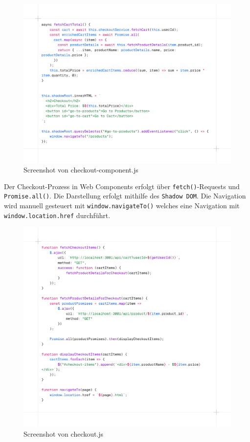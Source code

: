 \documentclass[oneside]{ausarbeitung}
\begin{document}
\begin{figure}[H]
    \centering
    \includegraphics[width=\linewidth]{images/wcheckoutcomponent.png}
    \caption{Screenshot von checkout-component.js}
    \label{fig:wcheckout}
\end{figure}

Der Checkout-Prozess in Web Components erfolgt über \texttt{fetch()}-Requests und \texttt{Promise.all()}. Die Darstellung erfolgt mithilfe des \texttt{Shadow DOM}. Die Navigation wird manuell gesteuert mit \texttt{window.navigateTo()} welches eine Navigation mit \texttt{window.location.href} durchführt.

\begin{figure}[H]
    \centering
    \includegraphics[width=\linewidth]{images/jqcheckout.png}
    \caption{Screenshot von checkout.js}
    \label{fig:wcheckout}
\end{figure}
\end{document}
